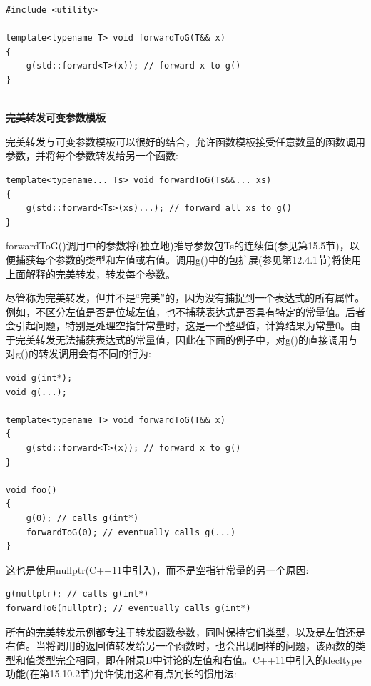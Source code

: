 \begin{lstlisting}[style=styleCXX]
#include <utility>

template<typename T> void forwardToG(T&& x)
{
	g(std::forward<T>(x)); // forward x to g()
}
\end{lstlisting}

\hspace*{\fill} \\ %
\noindent
\textbf{完美转发可变参数模板}

完美转发与可变参数模板可以很好的结合，允许函数模板接受任意数量的函数调用参数，并将每个参数转发给另一个函数:

\begin{lstlisting}[style=styleCXX]
template<typename... Ts> void forwardToG(Ts&&... xs)
{
	g(std::forward<Ts>(xs)...); // forward all xs to g()
}
\end{lstlisting}

forwardToG()调用中的参数将(独立地)推导参数包Ts的连续值(参见第15.5节)，以便捕获每个参数的类型和左值或右值。调用g()中的包扩展(参见第12.4.1节)将使用上面解释的完美转发，转发每个参数。

尽管称为完美转发，但并不是“完美”的，因为没有捕捉到一个表达式的所有属性。例如，不区分左值是否是位域左值，也不捕获表达式是否具有特定的常量值。后者会引起问题，特别是处理空指针常量时，这是一个整型值，计算结果为常量0。由于完美转发无法捕获表达式的常量值，因此在下面的例子中，对g()的直接调用与对g()的转发调用会有不同的行为:

\begin{lstlisting}[style=styleCXX]
void g(int*);
void g(...);

template<typename T> void forwardToG(T&& x)
{
	g(std::forward<T>(x)); // forward x to g()
}

void foo()
{
	g(0); // calls g(int*)
	forwardToG(0); // eventually calls g(...)
}
\end{lstlisting}

这也是使用nullptr(C++11中引入)，而不是空指针常量的另一个原因:

\begin{lstlisting}[style=styleCXX]
g(nullptr); // calls g(int*)
forwardToG(nullptr); // eventually calls g(int*)
\end{lstlisting}

所有的完美转发示例都专注于转发函数参数，同时保持它们类型，以及是左值还是右值。当将调用的返回值转发给另一个函数时，也会出现同样的问题，该函数的类型和值类型完全相同，即在附录B中讨论的左值和右值。C++11中引入的decltype功能(在第15.10.2节)允许使用这种有点冗长的惯用法:

